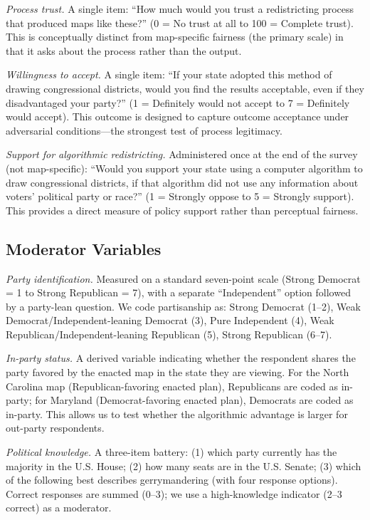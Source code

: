 \textit{Process trust.} A single item: ``How much would you trust a redistricting process that produced maps like these?'' (0 = No trust at all to 100 = Complete trust). This is conceptually distinct from map-specific fairness (the primary scale) in that it asks about the process rather than the output.

\textit{Willingness to accept.} A single item: ``If your state adopted this method of drawing congressional districts, would you find the results acceptable, even if they disadvantaged your party?'' (1 = Definitely would not accept to 7 = Definitely would accept). This outcome is designed to capture outcome acceptance under adversarial conditions---the strongest test of process legitimacy.

\textit{Support for algorithmic redistricting.} Administered once at the end of the survey (not map-specific): ``Would you support your state using a computer algorithm to draw congressional districts, if that algorithm did not use any information about voters' political party or race?'' (1 = Strongly oppose to 5 = Strongly support). This provides a direct measure of policy support rather than perceptual fairness.

\subsection{Moderator Variables}

\textit{Party identification.} Measured on a standard seven-point scale (Strong Democrat = 1 to Strong Republican = 7), with a separate ``Independent'' option followed by a party-lean question. We code partisanship as: Strong Democrat (1--2), Weak Democrat/Independent-leaning Democrat (3), Pure Independent (4), Weak Republican/Independent-leaning Republican (5), Strong Republican (6--7).

\textit{In-party status.} A derived variable indicating whether the respondent shares the party favored by the enacted map in the state they are viewing. For the North Carolina map (Republican-favoring enacted plan), Republicans are coded as in-party; for Maryland (Democrat-favoring enacted plan), Democrats are coded as in-party. This allows us to test whether the algorithmic advantage is larger for out-party respondents.

\textit{Political knowledge.} A three-item battery: (1) which party currently has the majority in the U.S. House; (2) how many seats are in the U.S. Senate; (3) which of the following best describes gerrymandering (with four response options). Correct responses are summed (0--3); we use a high-knowledge indicator (2--3 correct) as a moderator.

